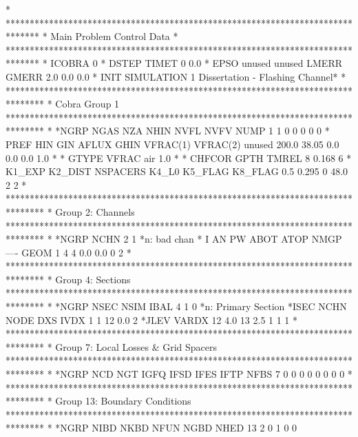 *
*******************************************************************************
* Main Problem Control Data                                                   *
*******************************************************************************
*       ICOBRA
             0
*        DSTEP         TIMET
             0           0.0
*         EPSO        unused        unused         LMERR         GMERR
           2.0                                       0.0           0.0
*     INIT                                                           SIMULATION
         1                                     Dissertation - Flashing Channel*
*
********************************************************************************
* Cobra Group 1
********************************************************************************
*
*NGRP NGAS  NZA NHIN NVFL NVFV NUMP 
    1    1    0    0    0    0    0
*     PREF       HIN       GIN     AFLUX      GHIN  VFRAC(1)  VFRAC(2)    unused
     200.0     38.05                 0.0       0.0       0.0       1.0          
*
*  GTYPE       VFRAC
air              1.0
*
*   CHFCOR      GPTH     TMREL
         8     0.168         6
*       K1_EXP       K2_DIST      NSPACERS         K4_L0       K5_FLAG       K8_FLAG
           0.5         0.295             0          48.0             2             2
*
********************************************************************************
* Group 2: Channels
********************************************************************************
*
*NGRP NCHN
    2    1
*n: bad chan
*   I   AN   PW ABOT ATOP NMGP ---- GEOM
    1    4    4  0.0  0.0    0         2
*
********************************************************************************
* Group 4: Sections
********************************************************************************
*
*NGRP NSEC NSIM IBAL
    4    1    0     
*n: Primary Section
*ISEC NCHN NODE       DXS IVDX
    1    1   12       0.0    2
*JLEV     VARDX 
   12       4.0   13       2.5
    1    1                             1                         
*
********************************************************************************
* Group 7: Local Losses & Grid Spacers
********************************************************************************
*
*NGRP  NCD  NGT IGFQ IFSD IFES IFTP      NFBS
    7    0    0    0    0    0    0    0    0
*
********************************************************************************
* Group 13: Boundary Conditions
********************************************************************************
*
*NGRP NIBD NKBD NFUN NGBD NHED     
   13    2    0    1    0    0
